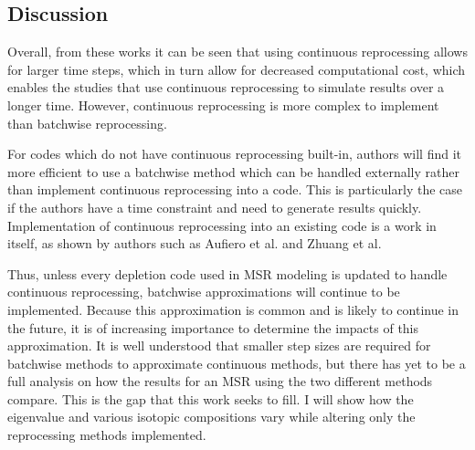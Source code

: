 \subsection{Discussion}
\label{litrev-msr-gaps}

Overall, from these works it can be seen that using continuous reprocessing allows for larger time steps, which in turn allow for decreased computational cost, which enables the studies that use continuous reprocessing to simulate results over a longer time.
However, continuous reprocessing is more complex to implement than batchwise reprocessing.

For codes which do not have continuous reprocessing built-in, authors will find it more efficient to use a batchwise method which can be handled externally rather than implement continuous reprocessing into a code.
This is particularly the case if the authors have a time constraint and need to generate results quickly.
Implementation of continuous reprocessing into an existing code is a work in itself, as shown by authors such as Aufiero et al. and Zhuang et al.

Thus, unless every depletion code used in MSR modeling is updated to handle continuous reprocessing, batchwise approximations will continue to be implemented.
Because this approximation is common and is likely to continue in the future, it is of increasing importance to determine the impacts of this approximation.
It is well understood that smaller step sizes are required for batchwise methods to approximate continuous methods, but there has yet to be a full analysis on how the results for an MSR using the two different methods compare.
This is the gap that this work seeks to fill.
I will show how the eigenvalue and various isotopic compositions vary while altering only the reprocessing methods implemented.

